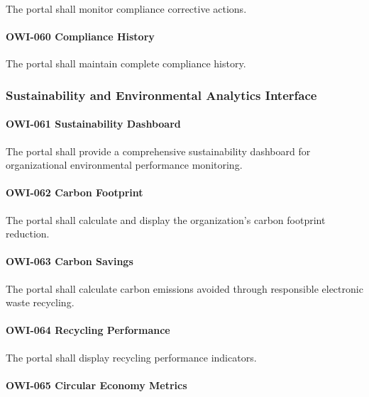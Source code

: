 The portal shall monitor compliance corrective actions.

\paragraph{OWI-060 Compliance History}

The portal shall maintain complete compliance history.


\subsubsection*{Sustainability and Environmental Analytics Interface}

\paragraph{OWI-061 Sustainability Dashboard}

The portal shall provide a comprehensive sustainability dashboard for
organizational environmental performance monitoring.

\paragraph{OWI-062 Carbon Footprint}

The portal shall calculate and display the organization's carbon
footprint reduction.

\paragraph{OWI-063 Carbon Savings}

The portal shall calculate carbon emissions avoided through responsible
electronic waste recycling.

\paragraph{OWI-064 Recycling Performance}

The portal shall display recycling performance indicators.

\paragraph{OWI-065 Circular Economy Metrics}

